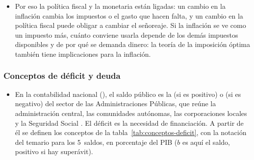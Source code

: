 \documentclass[11pt]{article}
\begin{document}
\begin{itemize}
  \begin{itemize}
  \item como \emph{restricción de los impuestos}: si se bajan hoy, tendrán que subir mañana (la equivalencia ricardiana y la suavización impositiva, \ref{sec:nmc});
  \item como \emph{condición de sostenibilidad}: lo que cuesta cumplirla depende del tipo de interés frente al crecimiento (bloque~\ref{sec:dinamica});
  \item como \emph{reparto entre las 2~autoridades}: si la política fiscal no genera los superávits, la cierra el banco central con señoreaje o el nivel de precios (bloque~\ref{sec:dominacion}).
  \end{itemize}
  Son las respuestas a la pregunta del enganche: el déficit lo paga el contribuyente de hoy o el de mañana, el crecimiento cuando supera al tipo de interés o, con inflación, quien tiene dinero y deuda nominal.
\item Por eso la política fiscal y la monetaria están ligadas: un cambio en la inflación cambia los impuestos o el gasto que hacen falta, y un cambio en la política fiscal puede obligar a cambiar el señoreaje. Si la inflación se ve como un impuesto más, cuánto conviene usarla depende de los demás impuestos disponibles y de por qué se demanda dinero: la teoría de la imposición óptima también tiene implicaciones para la inflación.
\end{itemize}

\subsubsection{Conceptos de déficit y deuda}\label{sec:conceptos}

\begin{itemize}
\item En la contabilidad nacional (), el saldo público es la  (si es positivo) o  (si es negativo) del sector de las Administraciones Públicas, que reúne la administración central, las comunidades autónomas, las corporaciones locales y la Seguridad Social\nocite{SEC2010}  . El déficit es la necesidad de financiación. A partir de él se definen los conceptos de la tabla~\ref{tab:conceptos-deficit}, con la notación del temario para los 5~saldos, en porcentaje del PIB ($b$ es aquí el saldo, positivo si hay superávit).
\end{itemize}
\end{document}
